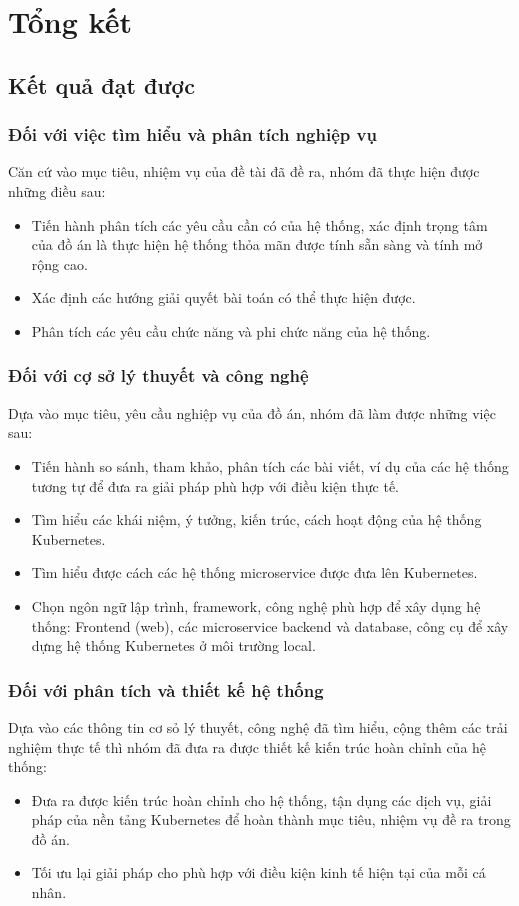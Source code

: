\chapter{Tổng kết}
\section{Kết quả đạt được}
\subsection{Đối với việc tìm hiểu và phân tích nghiệp vụ}
\noindent Căn cứ vào mục tiêu, nhiệm vụ của đề tài đã đề ra, nhóm đã thực hiện được những điều sau:
\begin{itemize}
    \item Tiến hành phân tích các yêu cầu cần có của hệ thống, xác định trọng tâm của đồ án là thực hiện hệ thống thỏa mãn được tính sẵn sàng và tính mở rộng cao.
    \item Xác định các hướng giải quyết bài toán có thể thực hiện được.
    \item Phân tích các yêu cầu chức năng và phi chức năng của hệ thống.
\end{itemize}

\subsection{Đối với cợ sở lý thuyết và công nghệ}
\noindent Dựa vào mục tiêu, yêu cầu nghiệp vụ của đồ án, nhóm đã làm được những việc sau:
\begin{itemize}
    \item Tiến hành so sánh, tham khảo, phân tích các bài viết, ví dụ của các hệ thống tương tự để đưa ra giải pháp phù hợp với điều kiện thực tế.
    \item Tìm hiểu các khái niệm, ý tưởng, kiến trúc, cách hoạt động của hệ thống Kubernetes.
    \item Tìm hiểu được cách các hệ thống microservice được đưa lên Kubernetes.
    \item Chọn ngôn ngữ lập trình, framework, công nghệ phù hợp để xây dụng hệ thống: Frontend (web), các microservice backend và database, công cụ để xây dựng hệ thống Kubernetes ở môi trường local.
\end{itemize}
\subsection{Đối với phân tích và thiết kế hệ thống}
\noindent Dựa vào các thông tin cơ sỏ lý thuyết, công nghệ đã tìm hiểu, cộng thêm các trải nghiệm thực tế thì nhóm đã đưa ra được thiết kế kiến trúc hoàn chỉnh của hệ thống:
\begin{itemize}
    \item Đưa ra được kiến trúc hoàn chỉnh cho hệ thống, tận dụng các dịch vụ, giải pháp của nền tảng Kubernetes để hoàn thành mục tiêu, nhiệm vụ đề ra trong đồ án.
    \item Tối ưu lại giải pháp cho phù hợp với điều kiện kinh tế hiện tại của mỗi cá nhân.
\end{itemize}
